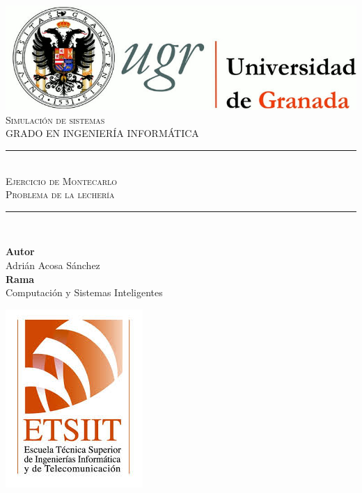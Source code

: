 \documentclass[11pt,a4paper]{report}
\newcommand{\asignatura}{Simulación de sistemas}
\newcommand{\autor}{Adrián Acosa Sánchez}
\newcommand{\titulo}{Ejercicio de Montecarlo}
\newcommand{\subtitulo}{Problema de la lechería}
\newcommand{\rama}{Computación y Sistemas Inteligentes}
\begin{document}

\begin{titlepage}

\begin{minipage}{\textwidth}

\centering

\includegraphics[scale=0.3]{img/logo_ugr.jpg}\\[1cm]

\textsc{\Large \asignatura{}\\[0.2cm]}
\textsc{GRADO EN INGENIERÍA INFORMÁTICA}\\[1cm]

\noindent\rule[-1ex]{\textwidth}{1pt}\\[1.5ex]
\textsc{{\Huge \titulo\\[0.5ex]}}
\textsc{{\Large \subtitulo\\}}
\noindent\rule[-1ex]{\textwidth}{2pt}\\[3.5ex]

\end{minipage}

\vspace{0.7cm}

\begin{minipage}{\textwidth}

\centering

\textbf{Autor}\\ {\autor{}}\\[2.5ex]
\textbf{Rama}\\ {\rama}\\[2.5ex]
\vspace{0.3cm}

\includegraphics[scale=0.3]{img/etsiit.jpeg}


\end{minipage}
\end{titlepage}
\end{document}

